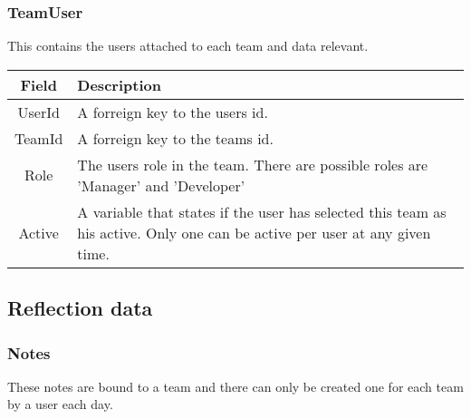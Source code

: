 \subsubsection*{TeamUser}
This contains the users attached to each team and data relevant. \\

\vspace{0.5cm}
\begin{tabularx}{\linewidth}{| c | X |}
    \hline
    \rowcolor[gray]{0.8}
    \textbf{Field} & \textbf{Description} \\
    \hline
    UserId & A forreign key to the users id.\\ \hline
   	TeamId & A forreign key to the teams id.\\ \hline
   	Role & The users role in the team. There are possible roles are 'Manager' and 'Developer'\\ \hline
    Active & A variable that states if the user has selected this team as his active. Only one can be active per user at any given time.\\ 
    \hline
\end{tabularx}
\vspace{0.5cm}

\subsection{Reflection data}
\subsubsection*{Notes}
These notes are bound to a team and there can only be created one for each team by a user each day. \\

